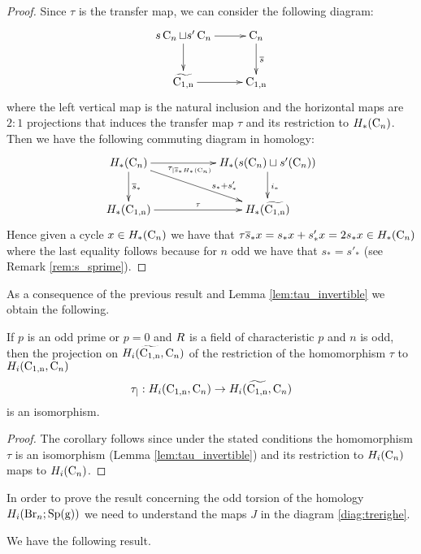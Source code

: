 \begin{proof}
Since $\tau$ is the transfer map, we can consider the following diagram:
	$$
\begin{tabular}{c}
\xymatrix @R=2pc @C=2pc {
s\conf_n  \sqcup s' \conf_n \ar[d] \ar[r] & \conf_n \ar[d]^{\overline{s}} \\
\confmd{n} \ar[r]& \confm{n}
}
\end{tabular}
$$
where the left vertical map is the natural inclusion and the horizontal maps are $2:1$ projections that induces the transfer map $\tau$ and its restriction to $H_*(\operatorname{C}_n)$. 
Then we have the following commuting diagram in homology:
$$
\xymatrix{ 
H_*(\conf_n) 
\ar[d]^{\overline{s}_*} \ar[drr]^(0.65){s_*+s'_*} \ar[rr]_(0.44){\tau_{|\overline{s}_*H_*(\conf_n)}} 
&& 
H_*(s(\conf_{n})  \sqcup s'(\conf_{n}))
\ar[d]^{i_*} 
\\
H_*(\confm{n}) 
\ar[rr]^\tau 
&& 
H_*(\confmd{n}) 
 }
$$
Hence given a cycle $x \in H_*(\operatorname{C}_n)$ we have that %
$\tau \overline{s}_* x = s_* x + s'_* x = 2 s_* x \in H_*(\operatorname{C}_n)$
where the last equality follows because for $n$ odd we have that $s_*=s'_*$ (see Remark \ref{rem:s_sprime}).
%
\end{proof}

As a consequence of the previous result and Lemma \ref{lem:tau_invertible} we obtain the following.
\begin{cor} \label{cor:tau_restricted}
	If $p$ is an odd prime or $p=0$ and $R$ is a field of characteristic $p$ and $n$ is odd, then the projection on $H_i(\widetilde{\operatorname{C_{1,n}}},\operatorname{C}_n)$ of the restriction of the homomorphism $\tau$ to $H_i(\operatorname{C_{1,n}},\operatorname{C}_n)$
	$$
	\tau_|:H_i(\operatorname{C_{1,n}},\operatorname{C}_n) \to H_i(\widetilde{\operatorname{C_{1,n}}},\operatorname{C}_n)
	$$
	is an isomorphism.
\end{cor}
\begin{proof}
The corollary follows since under the stated conditions the homomorphism $\tau$ is an isomorphism (Lemma \ref{lem:tau_invertible}) and its restriction to $H_i(\operatorname{C}_n)$ maps to $H_i(\operatorname{C}_n)$.
\end{proof}

In order to prove the result concerning the odd torsion of the homology $H_i(\operatorname{Br}_n; \operatorname{Sp({g})})$ we need to understand the maps 
$J$ in the diagram \eqref{diag:trerighe}.

We have the following result.
	
